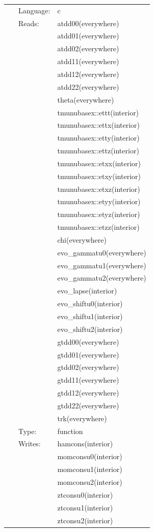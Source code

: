 \documentclass{article}
\begin{document}
 \begin{tabular*}{160mm}{cll} 
~ & Language:  & c \\ 
~ & Reads:  & atdd00(everywhere) \\ 
~& ~ &atdd01(everywhere)\\ 
~& ~ &atdd02(everywhere)\\ 
~& ~ &atdd11(everywhere)\\ 
~& ~ &atdd12(everywhere)\\ 
~& ~ &atdd22(everywhere)\\ 
~& ~ &theta(everywhere)\\ 
~& ~ &tmunubasex::ettt(interior)\\ 
~& ~ &tmunubasex::ettx(interior)\\ 
~& ~ &tmunubasex::etty(interior)\\ 
~& ~ &tmunubasex::ettz(interior)\\ 
~& ~ &tmunubasex::etxx(interior)\\ 
~& ~ &tmunubasex::etxy(interior)\\ 
~& ~ &tmunubasex::etxz(interior)\\ 
~& ~ &tmunubasex::etyy(interior)\\ 
~& ~ &tmunubasex::etyz(interior)\\ 
~& ~ &tmunubasex::etzz(interior)\\ 
~& ~ &chi(everywhere)\\ 
~& ~ &evo\_gammatu0(everywhere)\\ 
~& ~ &evo\_gammatu1(everywhere)\\ 
~& ~ &evo\_gammatu2(everywhere)\\ 
~& ~ &evo\_lapse(interior)\\ 
~& ~ &evo\_shiftu0(interior)\\ 
~& ~ &evo\_shiftu1(interior)\\ 
~& ~ &evo\_shiftu2(interior)\\ 
~& ~ &gtdd00(everywhere)\\ 
~& ~ &gtdd01(everywhere)\\ 
~& ~ &gtdd02(everywhere)\\ 
~& ~ &gtdd11(everywhere)\\ 
~& ~ &gtdd12(everywhere)\\ 
~& ~ &gtdd22(everywhere)\\ 
~& ~ &trk(everywhere)\\ 
~ & Type:  & function \\ 
~ & Writes:  & hamcons(interior) \\ 
~& ~ &momconsu0(interior)\\ 
~& ~ &momconsu1(interior)\\ 
~& ~ &momconsu2(interior)\\ 
~& ~ &ztconsu0(interior)\\ 
~& ~ &ztconsu1(interior)\\ 
~& ~ &ztconsu2(interior)\\ 
\end{tabular*} 
\end{document}
